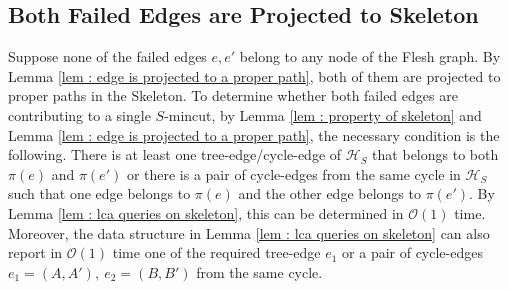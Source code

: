 \documentclass[letterpaper,11pt]{article}
\begin{document}
\subsection{Both Failed Edges are Projected to Skeleton} \label{sec : projected to skeleton}
Suppose none of the failed edges $e,e'$ belong to any node of the Flesh graph. 
By Lemma \ref{lem : edge is projected to a proper path}, both of them are projected to proper paths in the Skeleton. To determine whether both failed edges are contributing to a single $S$-mincut, by Lemma \ref{lem : property of skeleton} and Lemma \ref{lem : edge is projected to a proper path}, the necessary condition is the following. There is at least one tree-edge/cycle-edge of ${\mathcal H}_S$ that belongs to both $\pi(e)$ and $\pi(e')$ or there is a pair of cycle-edges from the same cycle in ${\mathcal H}_S$ such that one edge belongs to $\pi(e)$ and the other edge belongs to $\pi(e')$. By Lemma \ref{lem : lca queries on skeleton}, this can be determined in ${\mathcal O}(1)$ time.
Moreover, the data structure in Lemma \ref{lem : lca queries on skeleton} can also report in ${\mathcal O}(1)$ time one of the required tree-edge $e_1$ or a pair of cycle-edges $e_1=(A,A'),~e_2=(B,B')$ from the same cycle. 
\end{document}
